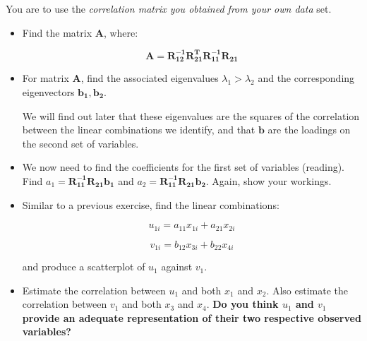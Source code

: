 \documentclass[11pt]{article}
\begin{document}

You are to use the \emph{correlation matrix you obtained from your own data} set.

\begin{itemize}

\item Find the matrix $\boldsymbol{A}$, where:

\begin{displaymath}
\boldsymbol{A} = \boldsymbol{R_{12}^{-1}R_{21}^{T}R_{11}^{-1}R_{21}}
\end{displaymath}

\item For matrix $\boldsymbol{A}$, find the associated eigenvalues $\lambda_{1} > \lambda_{2}$ and the corresponding eigenvectors $\boldsymbol{b_{1}}, \boldsymbol{b_{2}}$.   

We will find out later that these eigenvalues are the squares of the correlation between the linear combinations we identify, and that $\boldsymbol{b}$ are the loadings on the second set of variables.

\item We now need to find the coefficients for the first set of variables (reading).   Find 
$a_{1} = \boldsymbol{R_{11}^{-1} R_{21} b_{1}}$ and $a_{2} = \boldsymbol{R_{11}^{-1} R_{21} b_{2}}$.   Again, show your workings.

\item Similar to a previous exercise, find the linear combinations:

\begin{displaymath}
u_{1i}  = a_{11}x_{1i} + a_{21}x_{2i}   
\end{displaymath}

\begin{displaymath}
v_{1i} =  b_{12}x_{3i} + b_{22}x_{4i}  
\end{displaymath}

and produce a scatterplot of $u_{1}$ against $v_{1}$.


\item Estimate the correlation between $u_{1}$ and both $x_{1}$ and $x_{2}$.   Also estimate the correlation between $v_{1}$ and both $x_{3}$ and $x_{4}$.   \textbf{Do you think $u_{1}$ and $v_{1}$ provide an adequate representation of their two respective observed variables?}


\end{itemize}
\end{document}
